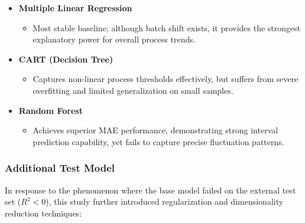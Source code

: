 \documentclass[11pt]{article}
\providecommand{\tightlist}{%
      \setlength{\itemsep}{0pt}\setlength{\parskip}{0pt}}
\begin{document}
\begin{itemize}
\tightlist
\item
  \textbf{Multiple Linear Regression}

  \begin{itemize}
  \tightlist
  \item
    Most stable baseline; although batch shift exists, it provides the
    strongest explanatory power for overall process trends.
  \end{itemize}
\item
  \textbf{CART (Decision Tree)}

  \begin{itemize}
  \tightlist
  \item
    Captures non-linear process thresholds effectively, but suffers from
    severe overfitting and limited generalization on small samples.
  \end{itemize}
\item
  \textbf{Random Forest}

  \begin{itemize}
  \tightlist
  \item
    Achieves superior MAE performance, demonstrating strong interval
    prediction capability, yet fails to capture precise fluctuation
    patterns.
  \end{itemize}
\end{itemize}

    \subsubsection{Additional Test Model}\label{additional-test-model}

In response to the phenomenon where the base model failed on the
external test set (\(R^2 < 0\)), this study further introduced
regularization and dimensionality reduction techniques:
\end{document}
